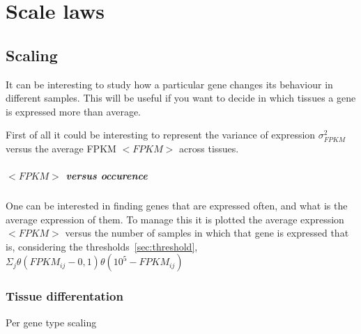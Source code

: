 \chapter{Scale laws}\label{ch:scalelaws}

\section{Scaling}
It can be interesting to study how a particular gene changes its behaviour in different samples. 
This will be useful if you want to decide in which tissues a gene is expressed more than average.

First of all it could be interesting to represent the variance of expression $\sigma^2_{FPKM}$ versus 
the average FPKM $<FPKM>$ across tissues.





\paragraph{$<FPKM>$ versus occurence}
One can be interested in finding genes that are expressed often, and what is the 
average expression of them.
To manage this it is plotted the average expression $<FPKM>$ versus the number 
of samples in which that gene is expressed that is, considering the thresholds~\ref{sec:threshold}, 
$\Sigma_j\theta (FPKM_{ij}-0,1)\theta (10^5-FPKM_{ij})$

\subsection{Tissue differentation}
Per gene type scaling




